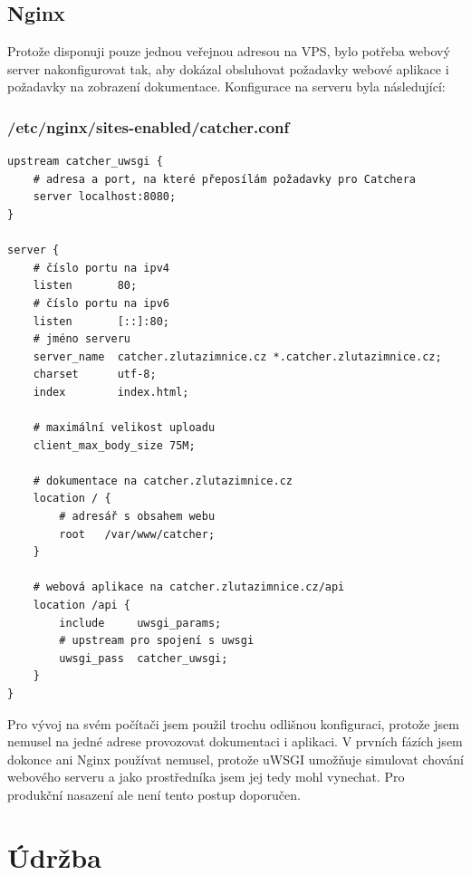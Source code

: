 \subsection*{Nginx}

\indent

Protože disponuji pouze jednou veřejnou adresou na VPS, bylo potřeba webový server nakonfigurovat tak,
aby dokázal obsluhovat požadavky webové aplikace i požadavky
na zobrazení dokumentace. Konfigurace na serveru byla následující:

\subsubsection*{/etc/nginx/sites-enabled/catcher.conf}

\begingroup
\fontsize{9.5pt}{11pt}\selectfont
\begin{verbatim}
upstream catcher_uwsgi {
    # adresa a port, na které přeposílám požadavky pro Catchera
    server localhost:8080;
}

server {
    # číslo portu na ipv4
    listen       80;
    # číslo portu na ipv6
    listen       [::]:80;
    # jméno serveru
    server_name  catcher.zlutazimnice.cz *.catcher.zlutazimnice.cz;
    charset      utf-8;
    index        index.html;
    
    # maximální velikost uploadu
    client_max_body_size 75M;

    # dokumentace na catcher.zlutazimnice.cz
    location / {
        # adresář s obsahem webu
        root   /var/www/catcher;
    }

    # webová aplikace na catcher.zlutazimnice.cz/api
    location /api {
        include     uwsgi_params;
        # upstream pro spojení s uwsgi
        uwsgi_pass  catcher_uwsgi;
    }
}
\end{verbatim}
\endgroup

\medskip

Pro vývoj na svém počítači jsem použil trochu odlišnou konfiguraci, protože
jsem nemusel na jedné adrese provozovat dokumentaci i aplikaci.
V prvních fázích jsem dokonce ani Nginx používat nemusel, protože uWSGI umožňuje simulovat
chování webového serveru a jako prostředníka jsem jej tedy mohl vynechat.
Pro produkční nasazení ale není tento postup doporučen.

\section{Údržba}

\indent

